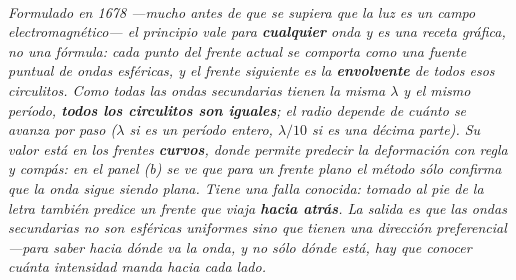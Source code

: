 \begin{center}
\begin{tikzpicture}[scale=0.92, transform shape]
\end{tikzpicture}\\[0.5em]
{\small\itshape Formulado en 1678 ---mucho antes de que se supiera que la luz es
un campo electromagnético--- el principio vale para \textbf{cualquier} onda y es
una receta gráfica, no una fórmula: cada punto del frente actual se comporta como
una fuente puntual de ondas esféricas, y el frente siguiente es la
\textbf{envolvente} de todos esos circulitos. Como todas las ondas secundarias
tienen la misma $\lambda$ y el mismo período, \textbf{todos los circulitos son
iguales}; el radio depende de cuánto se avanza por paso ($\lambda$ si es un
período entero, $\lambda/10$ si es una décima parte). Su valor está en los frentes
\textbf{curvos}, donde permite predecir la deformación con regla y compás: en el
panel (b) se ve que para un frente plano el método sólo confirma que la onda sigue
siendo plana. Tiene una falla conocida: tomado al pie de la letra también predice
un frente que viaja \textbf{hacia atrás}. La salida es que las ondas secundarias
no son esféricas uniformes sino que tienen una dirección preferencial ---para
saber hacia dónde va la onda, y no sólo dónde está, hay que conocer cuánta
intensidad manda hacia cada lado.}
\end{center}
